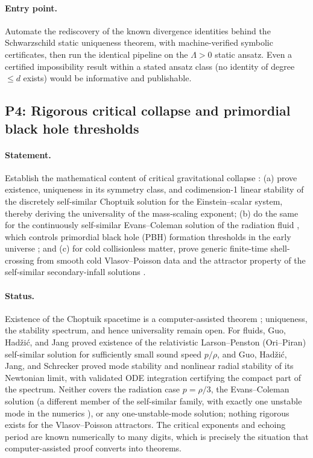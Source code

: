 \documentclass[11pt,letterpaper]{article}
\begin{document}
\paragraph{Entry point.} Automate the rediscovery of the known divergence identities behind the Schwarzschild static uniqueness theorem, with machine-verified symbolic certificates, then run the identical pipeline on the $\Lambda>0$ static ansatz. Even a certified impossibility result within a stated ansatz class (no identity of degree $\le d$ exists) would be informative and publishable.

\subsection{P4: Rigorous critical collapse and primordial black hole thresholds}
\label{sec:p4}

\paragraph{Statement.} Establish the mathematical content of critical gravitational collapse \cite{choptuik1993,gundlach2007}: (a) prove existence, uniqueness in its symmetry class, and codimension-1 linear stability of the discretely self-similar Choptuik solution for the Einstein--scalar system, thereby deriving the universality of the mass-scaling exponent; (b) do the same for the continuously self-similar Evans--Coleman solution of the radiation fluid \cite{evanscoleman1994}, which controls primordial black hole (PBH) formation thresholds in the early universe \cite{musco2019}; and (c) for cold collisionless matter, prove generic finite-time shell-crossing from smooth cold Vlasov--Poisson data and the attractor property of the self-similar secondary-infall solutions \cite{fillmoregoldreich1984,bertschinger1985,rampfhahn2021}.

\paragraph{Status.} Existence of the Choptuik spacetime is a computer-assisted theorem \cite{reiterer2019}; uniqueness, the stability spectrum, and hence universality remain open. For fluids, Guo, Had\v{z}i\'c, and Jang \cite{ghj2023} proved existence of the relativistic Larson--Penston (Ori--Piran) self-similar solution for sufficiently small sound speed $p/\rho$, and Guo, Had\v{z}i\'c, Jang, and Schrecker \cite{ghjs2025} proved mode stability and nonlinear radial stability of its Newtonian limit, with validated ODE integration certifying the compact part of the spectrum. Neither covers the radiation case $p=\rho/3$, the Evans--Coleman solution (a different member of the self-similar family, with exactly one unstable mode in the numerics \cite{kha1995,maison1996,harada2003}), or any one-unstable-mode solution; nothing rigorous exists for the Vlasov--Poisson attractors. The critical exponents and echoing period are known numerically to many digits, which is precisely the situation that computer-assisted proof converts into theorems.
\end{document}
